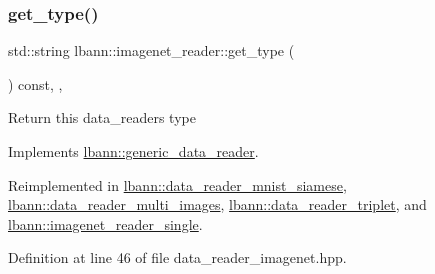 \subsubsection{\texorpdfstring{get\+\_\+type()}{get\_type()}}
{\footnotesize\ttfamily std\+::string lbann\+::imagenet\+\_\+reader\+::get\+\_\+type (\begin{DoxyParamCaption}{ }\end{DoxyParamCaption}) const\hspace{0.3cm}{\ttfamily [inline]}, {\ttfamily [override]}, {\ttfamily [virtual]}}

Return this data\+\_\+reader\textquotesingle{}s type 

Implements \hyperlink{classlbann_1_1generic__data__reader_abeb849fb8e10b4fa317c90bc33f61758}{lbann\+::generic\+\_\+data\+\_\+reader}.



Reimplemented in \hyperlink{classlbann_1_1data__reader__mnist__siamese_a2c5a29603f850bb0684dba1c64981604}{lbann\+::data\+\_\+reader\+\_\+mnist\+\_\+siamese}, \hyperlink{classlbann_1_1data__reader__multi__images_a9939a88a40caf7b2a27de08deca54ac1}{lbann\+::data\+\_\+reader\+\_\+multi\+\_\+images}, \hyperlink{classlbann_1_1data__reader__triplet_a7ff627eed9a4671129cbf7fb9ca11871}{lbann\+::data\+\_\+reader\+\_\+triplet}, and \hyperlink{classlbann_1_1imagenet__reader__single_aecd9cec6777e4a7485daa5b0396afee0}{lbann\+::imagenet\+\_\+reader\+\_\+single}.



Definition at line 46 of file data\+\_\+reader\+\_\+imagenet.\+hpp.


